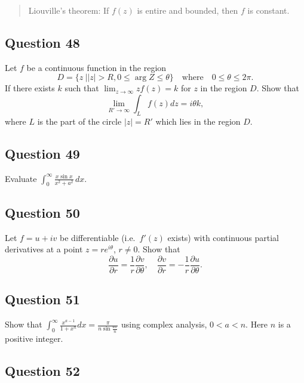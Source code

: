 \documentclass[12pt]{article}
\begin{document}
\begin{quote}
Liouville's theorem: If \(f(z)\) is entire and bounded, then \(f\) is
constant.
\end{quote}

\hypertarget{question-48-2}{%
\subsection{Question 48}\label{question-48-2}}

Let \(f\) be a continuous function in the region
\[D=\{z\ |  |z|>R, 0\leq \arg Z\leq \theta\}\quad\text{where}\quad
0\leq \theta \leq 2\pi.\] If there exists \(k\) such that
\(\displaystyle{\lim_{z\to\infty} zf(z)=k}\) for \(z\) in the region
\(D\). Show that \[\lim_{R'\to\infty} \int_{L} f(z) dz=i\theta k,\]
where \(L\) is the part of the circle \(|z|=R'\) which lies in the
region \(D\).

\hypertarget{question-49-2}{%
\subsection{Question 49}\label{question-49-2}}

Evaluate
\(\displaystyle{ \int_{0}^{\infty}\frac{x\sin x}{x^2+a^2} \, dx }\).

\hypertarget{question-50-2}{%
\subsection{Question 50}\label{question-50-2}}

Let \(f=u+iv\) be differentiable (i.e.~\(f'(z)\) exists) with continuous
partial derivatives at a point \(z=re^{i\theta}\), \(r\not= 0\). Show
that
\[\frac{\partial u}{\partial r}=\frac{1}{r}\frac{\partial v}{\partial \theta},\quad
\frac{\partial v}{\partial r}=-\frac{1}{r}\frac{\partial u}{\partial \theta}.\]

\hypertarget{question-51-2}{%
\subsection{Question 51}\label{question-51-2}}

Show that
\(\displaystyle \int_0^\infty \frac{x^{a-1}}{1+x^n} dx=\frac{\pi}{n\sin \frac{a\pi}{n}}\)
using complex analysis, \(0< a < n\). Here \(n\) is a positive integer.

\hypertarget{question-52-2}{%
\subsection{Question 52}\label{question-52-2}}
\end{document}
